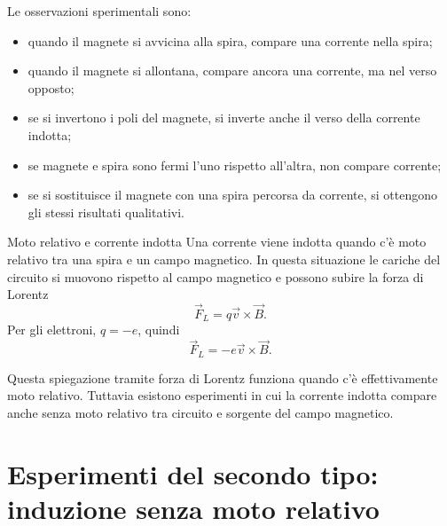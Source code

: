\documentclass[a4paper]{article}
\begin{document}
\begin{center}
\end{center}

Le osservazioni sperimentali sono:
\begin{itemize}
\item quando il magnete si avvicina alla spira, compare una corrente nella spira;
\item quando il magnete si allontana, compare ancora una corrente, ma nel verso opposto;
\item se si invertono i poli del magnete, si inverte anche il verso della corrente indotta;
\item se magnete e spira sono fermi l'uno rispetto all'altra, non compare corrente;
\item se si sostituisce il magnete con una spira percorsa da corrente, si ottengono gli stessi risultati qualitativi.
\end{itemize}

\begin{snippetproposition}{Moto relativo e corrente indotta}
Una corrente viene indotta quando c'è moto relativo tra una spira e un campo magnetico. In questa situazione le cariche del circuito si muovono rispetto al campo magnetico e possono subire la forza di Lorentz
\[
    \vec{F}_L=q\vec{v}\times\vec{B}.
\]
Per gli elettroni, \(q=-e\), quindi
\[
    \vec{F}_L=-e\vec{v}\times\vec{B}.
\]
\end{snippetproposition}

Questa spiegazione tramite forza di Lorentz funziona quando c'è effettivamente moto relativo. Tuttavia esistono esperimenti in cui la corrente indotta compare anche senza moto relativo tra circuito e sorgente del campo magnetico.

\section{Esperimenti del secondo tipo: induzione senza moto relativo}
\end{document}
